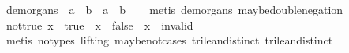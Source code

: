 \begin{isabellebody}
\endisatagproof
{\isafoldproof}%
%
\isadelimproof
\isanewline
%
\endisadelimproof
\isanewline
{}\isamarkupfalse%
\ de{\isacharunderscore}morgans{\isacharunderscore}{}{\isacharcolon}\ {\isachardoublequoteopen}{\isasymnot}\isactrlsub {\isacharquery}\ {\isacharparenleft}a\ {\isasymand}\isactrlsub {\isacharquery}\ b{\isacharparenright}\ {\isacharequal}\ {\isacharparenleft}{\isasymnot}\isactrlsub {\isacharquery}a{\isacharparenright}\ {\isasymor}\isactrlsub {\isacharquery}\ {\isacharparenleft}{\isasymnot}\isactrlsub {\isacharquery}b{\isacharparenright}{\isachardoublequoteclose}\isanewline
%
\isadelimproof
\ \ %
\endisadelimproof
%
\isatagproof
{}\isamarkupfalse%
\ {\isacharparenleft}metis\ de{\isacharunderscore}morgans{\isacharunderscore}{}\ maybe{\isacharunderscore}double{\isacharunderscore}negation{\isacharparenright}%
\endisatagproof
{\isafoldproof}%
%
\isadelimproof
\isanewline
%
\endisadelimproof
\isanewline
{}\isamarkupfalse%
\ not{\isacharunderscore}true{\isacharcolon}\ {\isachardoublequoteopen}{\isacharparenleft}x\ {\isasymnoteq}\ true{\isacharparenright}\ {\isacharequal}\ {\isacharparenleft}x\ {\isacharequal}\ false\ {\isasymor}\ x\ {\isacharequal}\ invalid{\isacharparenright}{\isachardoublequoteclose}\isanewline
%
\isadelimproof
\ \ %
\endisadelimproof
%
\isatagproof
{}\isamarkupfalse%
\ {\isacharparenleft}metis\ {\isacharparenleft}no{\isacharunderscore}types{\isacharcomma}\ lifting{\isacharparenright}\ maybe{\isacharunderscore}not{\isachardot}cases\ trilean{\isachardot}distinct{\isacharparenleft}{}{\isacharparenright}\ trilean{\isachardot}distinct{\isacharparenleft}{}{\isacharparenright}{\isacharparenright}%
\endisatagproof
{\isafoldproof}%
%
\isadelimproof
\isanewline
%
\endisadelimproof
%
\isadelimtheory
\isanewline
%
\endisadelimtheory
%
\isatagtheory
{}\isamarkupfalse%
%
\endisatagtheory
{\isafoldtheory}%
%
\isadelimtheory
%
\endisadelimtheory
%
\end{isabellebody}%
\endinput
